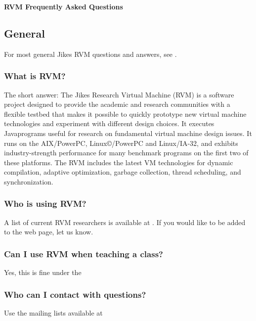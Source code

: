 \begin{center}  
{\bf RVM Frequently Asked Questions}
\end{center}

\subsection{General}

For most general Jikes RVM questions and answers, see
\xlink{{\tt \QandAURL}}{\QandAURL}.

\subsubsection{What is RVM?} 

The short answer:
The Jikes Research Virtual Machine (RVM) is a software project
designed to provide the academic and research communities with a
flexible testbed that makes it possible to quickly prototype new
virtual machine technologies and experiment with different design
choices. It executes Java\JavaTMFootnote programs useful for research on
fundamental virtual machine design issues.
It runs on the AIX\AIXTMFootnote/PowerPC\PowerPCTMFootnote,
Linux\copyright/PowerPC and Linux/IA-32, 
and exhibits industry-strength performance for many benchmark programs
on the first two of these platforms.  The RVM includes the latest VM
technologies for dynamic compilation, adaptive optimization, garbage
collection, thread scheduling, and synchronization.

\subsubsection{Who is using RVM?}
A list of current RVM researchers is available at
\xlink{{\tt \RVMUserListURL}}{\RVMUserListURL}.  If you would like to 
be added to the web page, let us know.

\subsubsection{Can I use RVM when teaching a class?}

Yes, this is fine under the

\subsubsection{Who can I contact with questions?}

Use the mailing lists available at 
\xlink{{\tt \RVMDownloadURL}}{\RVMDownloadURL}

